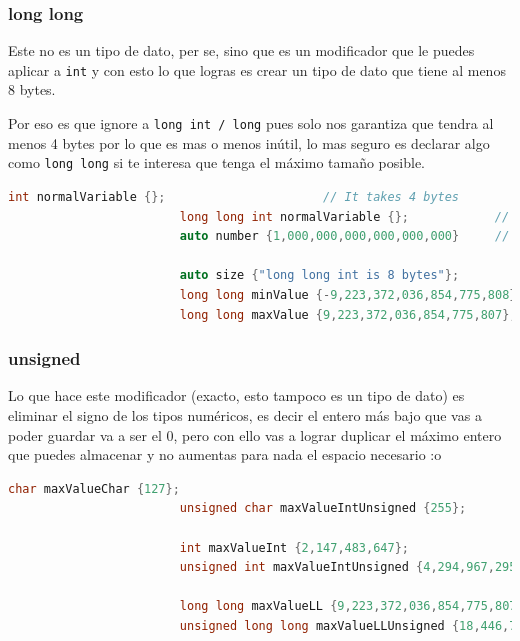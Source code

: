 \documentclass[12pt, fleqn]{report}                             %
\theoremstyle{break}                                            %
\newcommand{\textCode}[1]  { \texttt{#1} }                      %
\begin{document}
                \subsubsection{long long}

                    Este no es un tipo de dato, per se, sino que es un modificador que le puedes aplicar
                    a \textCode{int} y con esto lo que logras es crear un tipo de dato que tiene al menos 8 bytes.

                    Por eso es que ignore a \textCode{long int / long} pues solo nos garantiza que tendra al menos 4 bytes
                    por lo que es mas o menos inútil, lo mas seguro es declarar algo como \textCode{long long}
                    si te interesa que tenga el máximo tamaño posible.
                    \begin{lstlisting}[language=C++, gobble=24]
                        int normalVariable {};                      // It takes 4 bytes     
                        long long int normalVariable {};            // It takes 8 bytes 
                        auto number {1,000,000,000,000,000,000}     // number is long long  

                        auto size {"long long int is 8 bytes"};
                        long long minValue {-9,223,372,036,854,775,808};
                        long long maxValue {9,223,372,036,854,775,807};
                    \end{lstlisting}


                \subsubsection{unsigned}

                    Lo que hace este modificador (exacto, esto tampoco es un tipo de dato)
                    es eliminar el signo de los tipos numéricos, es decir el entero más bajo que vas
                    a poder guardar va a ser el 0, pero con ello vas a lograr duplicar
                    el máximo entero que puedes almacenar y no aumentas para nada el espacio necesario :o
                    \begin{lstlisting}[language=C++, gobble=24]
                        char maxValueChar {127};                    
                        unsigned char maxValueIntUnsigned {255};
                        
                        int maxValueInt {2,147,483,647};                    
                        unsigned int maxValueIntUnsigned {4,294,967,295};
                        
                        long long maxValueLL {9,223,372,036,854,775,807};                    
                        unsigned long long maxValueLLUnsigned {18,446,744,073,709,551,615};
                    \end{lstlisting}
\end{document}
